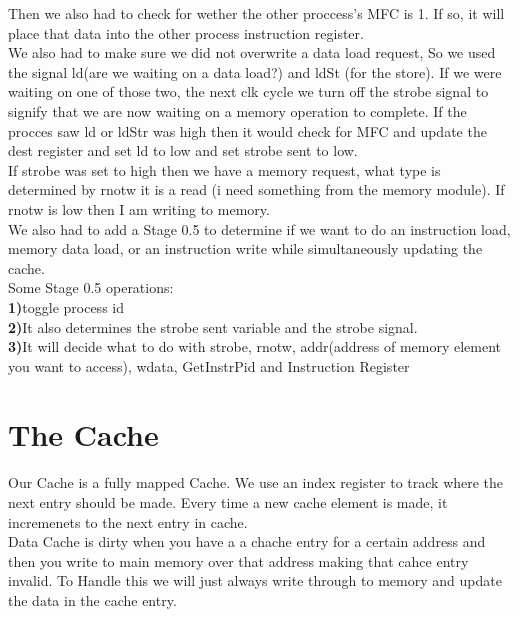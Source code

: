 \documentclass[12pt, twocolumn]{scrartcl}
\begin{document}
Then we also had to check for wether the other proccess's MFC is 1. If so, it will place that data into the other process instruction register. \\

We also had to make sure we did not overwrite a data load request, So we used the signal ld(are we waiting on a data load?) and ldSt (for the store).  If we were waiting on one of those two, the next clk cycle we turn off the strobe signal to signify that we are now waiting on a memory operation to complete. If the procces saw ld or ldStr was high then it would check for MFC and update the dest register and set ld to low and set strobe sent to low. \\

If strobe was set to high then we have a memory request, what type is determined by rnotw it is a read (i need something from the memory module). If rnotw is low then I am writing to memory. \\

We also had to add a Stage 0.5 to determine if we want to do an instruction load, memory data load, or an instruction write while simultaneously updating the cache. \\

Some Stage 0.5 operations: \\
\textbf {1)}toggle process id \\
\textbf {2)}It also determines the strobe sent variable and the strobe signal. \\
\textbf {3)}It will decide what to do with strobe, rnotw, addr(address of memory element you want to access), wdata, GetInstrPid and Instruction Register \\

\section*{The Cache}

Our Cache is a fully mapped Cache. We use an index register to track where the next entry should be made.  Every time a new cache element is made, it incremenets to the next entry in cache. \\

Data Cache is dirty when you have a a chache entry for a certain address and then you write to main memory over that address making that cahce entry invalid.  To Handle this we will just always write through to memory and update the data in the cache entry. \\
\end{document}
